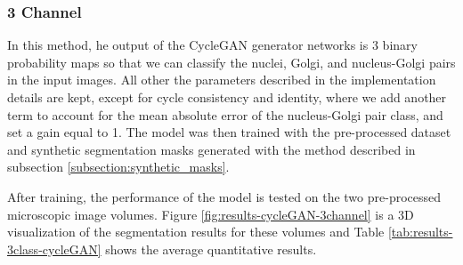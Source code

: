 \subsubsection*{3 Channel}
In this method, he output of the CycleGAN generator networks is 3 binary probability maps so that we can classify the nuclei, Golgi, and nucleus-Golgi pairs in the input images. All other the parameters described in the implementation details are kept, except for cycle consistency and identity, where we add another term to account for the mean absolute error of the nucleus-Golgi pair class, and set a gain equal to 1. The model was then trained with the pre-processed dataset and synthetic segmentation masks generated with the method described in subsection \ref{subsection:synthetic_masks}.

After training, the performance of the model is tested on the two pre-processed microscopic image volumes. Figure \ref{fig:results-cycleGAN-3channel} is a \ac{3D} visualization of the segmentation results for these volumes and Table \ref{tab:results-3class-cycleGAN} shows the average quantitative results.

\begin{table}[!htb]
\centering
\caption{Average metric values obtained from testing the 3 class unsupervised CycleGAN model on two pre-processed microscopic images}
\label{tab:results-3class-cycleGAN}
\end{table}

